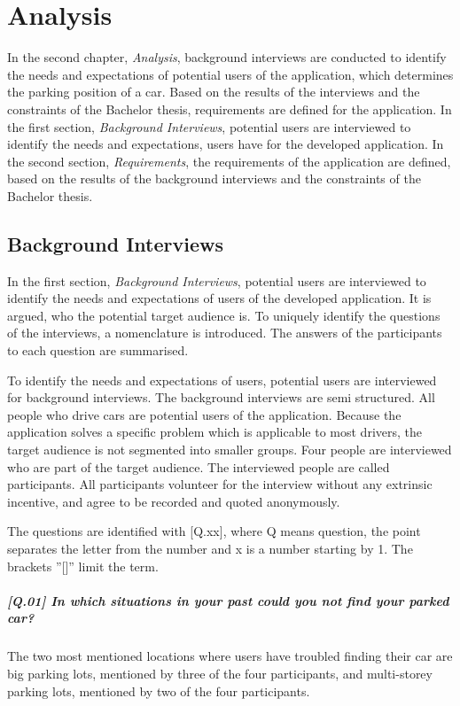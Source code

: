\chapter{Analysis}
In the second chapter, \textit{Analysis}, background interviews are conducted to identify the needs and expectations of potential users of the application, which determines the parking position of a car. Based on the results of the interviews and the constraints of the Bachelor thesis, requirements are defined for the application.
In the first section, \textit{Background Interviews}, potential users are interviewed to identify the needs and expectations, users have for the developed application.
In the second section, \textit{Requirements}, the requirements of the application are defined, based on the results of the background interviews and the constraints of the Bachelor thesis.

\section{Background Interviews}
In the first section, \textit{Background Interviews}, potential users are interviewed to identify the needs and expectations of  users of the developed application. It is argued, who the potential target audience is. To uniquely identify the questions of the interviews, a nomenclature is introduced. The answers of the participants to each question are summarised.

To identify the needs and expectations of users, potential users are interviewed for background interviews. The background interviews are semi structured. All people who drive cars are potential users of the application. Because the application solves a specific problem which is applicable to most drivers, the target audience is not segmented into smaller groups. Four people are interviewed who are part of the target audience. The interviewed people are called participants. All participants volunteer for the interview without any extrinsic incentive, and agree to be recorded and quoted anonymously. \cite{Abras2004} \cite{wilson2013interview}

The questions are identified with [Q.xx], where Q means question, the point separates the letter from the number and x is a number starting by 1. The brackets ''[]'' limit the term.

\paragraph{[Q.01] In which situations in your past could you not find your parked car?}
The two most mentioned locations where users have troubled finding their car are big parking lots, mentioned by three of the four participants, and multi-storey parking lots, mentioned by two of the four participants.

